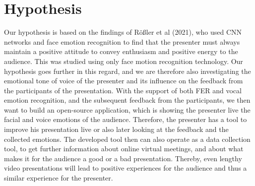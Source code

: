 \section{Hypothesis}
\label{sec:hypothesis}
Our hypothesis is based on the findings of Rößler et al (2021), who used CNN networks and face emotion recognition to find that the presenter must always maintain a positive attitude to convey enthusiasm and positive energy to the audience. This was studied using only face motion recognition technology. Our hypothesis goes further in this regard, and we are therefore also investigating the emotional tone of voice of the presenter and its influence on the feedback from the participants of the presentation. With the support of both FER and vocal emotion recognition, and the subsequent feedback from the participants, we then want to build an open-source application, which is showing the presenter live the facial and voice emotions of the audience. Therefore, the presenter has a tool to improve his presentation live or also later looking at the feedback and the collected emotions. The developed tool then can also operate as a data collection tool, to get further information about online virtual meetings, and about what makes it for the audience a good or a bad presentation. Thereby, even lengthy video presentations will lead to positive experiences for the audience and thus a similar experience for the presenter.
